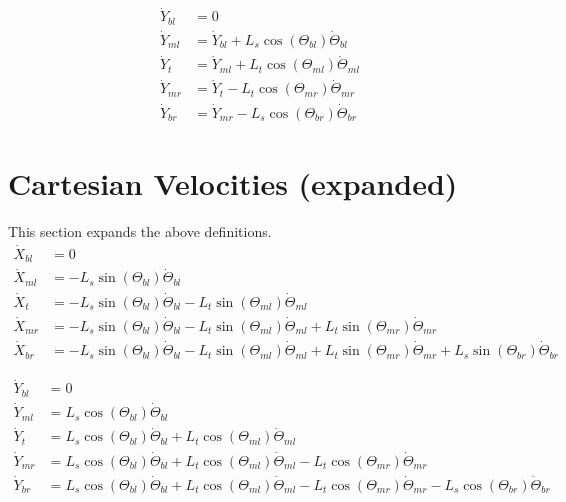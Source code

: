 \documentclass[11pt, landscape]{article}
\begin{document}
\begin{align}                                                                          
  \dot{Y}_{bl} &= 0 \\                                                        
  \dot{Y}_{ml} &= \dot{Y}_{bl} + L_{s}\cos(\Theta_{bl})\dot{\Theta}_{bl} \\
  \dot{Y}_{t}  &= \dot{Y}_{ml} + L_{t}\cos(\Theta_{ml})\dot{\Theta}_{ml} \\
  \dot{Y}_{mr} &= \dot{Y}_{t } - L_{t}\cos(\Theta_{mr})\dot{\Theta}_{mr} \\
  \dot{Y}_{br} &= \dot{Y}_{mr} - L_{s}\cos(\Theta_{br})\dot{\Theta}_{br}
\end{align}


\section{Cartesian Velocities (expanded)}
This section expands the above definitions. \\
\begin{align}
  \dot{X}_{bl} &= 0 \\
  \dot{X}_{ml} &= - L_{s}\sin(\Theta_{bl})\dot{\Theta}_{bl} \\
  \dot{X}_{t } &= - L_{s}\sin(\Theta_{bl})\dot{\Theta}_{bl} - L_{t}\sin(\Theta_{ml})\dot{\Theta}_{ml} \\
  \dot{X}_{mr} &= - L_{s}\sin(\Theta_{bl})\dot{\Theta}_{bl} - L_{t}\sin(\Theta_{ml})\dot{\Theta}_{ml} + L_{t}\sin(\Theta_{mr})\dot{\Theta}_{mr} \\
  \dot{X}_{br} &= - L_{s}\sin(\Theta_{bl})\dot{\Theta}_{bl} - L_{t}\sin(\Theta_{ml})\dot{\Theta}_{ml} + L_{t}\sin(\Theta_{mr})\dot{\Theta}_{mr} + L_{s}\sin(\Theta_{br})\dot{\Theta}_{br}
\end{align}             
             
\begin{align}                                                                               
  \dot{Y}_{bl} &= 0 \\                                                               
  \dot{Y}_{ml} &= L_{s}\cos(\Theta_{bl})\dot{\Theta}_{bl} \\
  \dot{Y}_{t}  &= L_{s}\cos(\Theta_{bl})\dot{\Theta}_{bl} + L_{t}\cos(\Theta_{ml})\dot{\Theta}_{ml} \\
  \dot{Y}_{mr} &= L_{s}\cos(\Theta_{bl})\dot{\Theta}_{bl} + L_{t}\cos(\Theta_{ml})\dot{\Theta}_{ml} - L_{t}\cos(\Theta_{mr})\dot{\Theta}_{mr} \\
  \dot{Y}_{br} &= L_{s}\cos(\Theta_{bl})\dot{\Theta}_{bl} + L_{t}\cos(\Theta_{ml})\dot{\Theta}_{ml} - L_{t}\cos(\Theta_{mr})\dot{\Theta}_{mr} - L_{s}\cos(\Theta_{br})\dot{\Theta}_{br}
\end{align}
\end{document}
